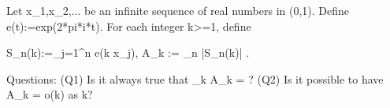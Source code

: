 Let x_1,x_2,... be an infinite sequence of real numbers in (0,1).
Define e(t):=exp(2*pi*i*t).
For each integer k>=1, define

  S_n(k):=\sum_{j=1}^n e(k x_j),
  A_k := \limsup_{n\to\infty} |S_n(k)| \in [0,\infty].

Questions:
  (Q1) Is it always true that  \limsup_{k\to\infty} A_k = \infty ?
  (Q2) Is it possible to have A_k = o(k) as k\to\infty ?
